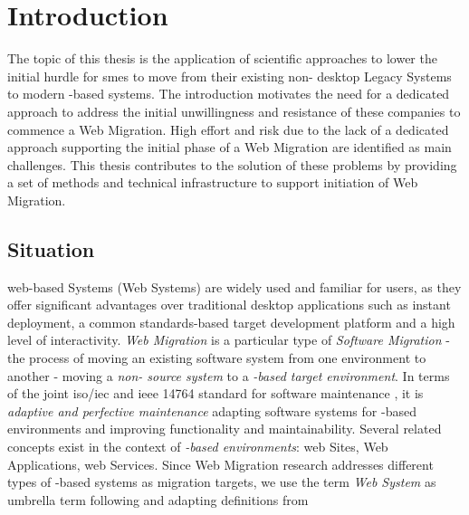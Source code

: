 \hypertarget{sec:introduction}{%
\chapter{Introduction}\label{sec:introduction}}

The topic of this thesis is the application of scientific approaches to lower the initial hurdle for \glspl{sme} to move from their existing non- desktop \glspl{Legacy System} to modern -based systems.
The introduction motivates the need for a dedicated approach to address the initial unwillingness and resistance of these companies to commence a \gls{Web Migration}.
High effort and risk due to the lack of a dedicated approach supporting the initial phase of a \gls{Web Migration} are identified as main challenges.
This thesis contributes to the solution of these problems by providing a set of methods and technical infrastructure to support initiation of \gls{Web Migration}.

\hypertarget{sec:situation}{%
\section{Situation}\label{sec:situation}}

\Gls{web}-based Systems (\glspl{Web System}) are widely used and familiar for users, as they offer significant advantages over traditional desktop applications such as instant deployment, a common standards-based target development platform and a high level of interactivity.
\emph{\gls{Web Migration}} is a particular type of \emph{\gls{Software Migration}} - the process of moving an existing software system from one environment to another \autocite{SWEBOK2014} - moving a \emph{non- source system} to a \emph{-based target environment}.
In terms of the joint \gls{iso}/\gls{iec} and \gls{ieee} 14764 standard for software maintenance \autocite{ISO/IEEE2006SoftwareLifeCycle}, it is \emph{adaptive and perfective maintenance} adapting software systems for -based environments and improving functionality and maintainability.
Several related concepts exist in the context of \emph{-based environments}: \Gls{web} Sites, \glspl{Web Application}, \Gls{web} Services.
Since \gls{Web Migration} research addresses different types of -based systems as migration targets, we use the term \emph{\gls{Web System}} as umbrella term following \autocite{Kienle2014EvolutionWeb} and adapting definitions from \autocite{Gaedke2000Diss,Kappel2006WebEngineering}

